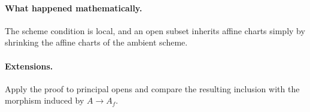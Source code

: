 \paragraph{What happened mathematically.}
The scheme condition is local, and an open subset inherits affine charts simply by shrinking the affine charts of the ambient scheme.

\paragraph{Extensions.}
Apply the proof to principal opens and compare the resulting inclusion with the morphism induced by $A\to A_f$.
\fi
